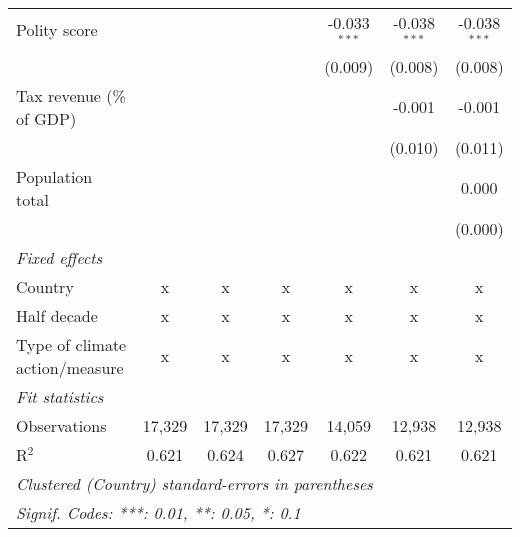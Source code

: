\begin{tabular}{lcccccc}
   Polity score                                                             &         &               &                & -0.033$^{***}$ & -0.038$^{***}$ & -0.038$^{***}$\\   
                                                                            &         &               &                & (0.009)        & (0.008)        & (0.008)\\   
   Tax revenue (\% of GDP)                                                  &         &               &                &                & -0.001         & -0.001\\   
                                                                            &         &               &                &                & (0.010)        & (0.011)\\   
   Population total                                                         &         &               &                &                &                & 0.000\\   
                                                                            &         &               &                &                &                & (0.000)\\   
   \emph{Fixed effects}\\
   Country                                                                  & x       & x             & x              & x              & x              & x\\  
   Half decade                                                              & x       & x             & x              & x              & x              & x\\  
   Type of climate action/measure                                           & x       & x             & x              & x              & x              & x\\  
   \midrule \emph{Fit statistics}\\
   Observations                                                             & 17,329  & 17,329        & 17,329         & 14,059         & 12,938         & 12,938\\  
   R$^2$                                                                    & 0.621   & 0.624         & 0.627          & 0.622          & 0.621          & 0.621\\  
   \midrule
   \multicolumn{7}{l}{\emph{Clustered (Country) standard-errors in parentheses}}\\
   \multicolumn{7}{l}{\emph{Signif. Codes: ***: 0.01, **: 0.05, *: 0.1}}\\
\end{tabular}
\par\endgroup


